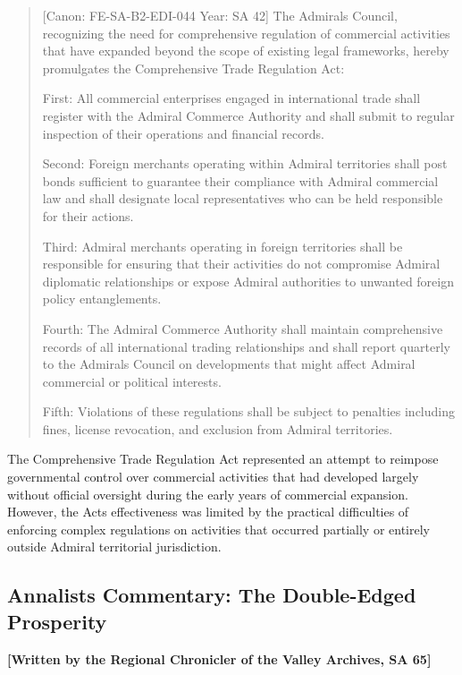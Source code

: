 \begin{quote}
{[}Canon: FE-SA-B2-EDI-044 \textbar{} Year: SA 42{]} The
Admiral\textquotesingle s Council, recognizing the need for
comprehensive regulation of commercial activities that have expanded
beyond the scope of existing legal frameworks, hereby promulgates the
Comprehensive Trade Regulation Act:

First: All commercial enterprises engaged in international trade shall
register with the Admiral Commerce Authority and shall submit to regular
inspection of their operations and financial records.

Second: Foreign merchants operating within Admiral territories shall
post bonds sufficient to guarantee their compliance with Admiral
commercial law and shall designate local representatives who can be held
responsible for their actions.

Third: Admiral merchants operating in foreign territories shall be
responsible for ensuring that their activities do not compromise Admiral
diplomatic relationships or expose Admiral authorities to unwanted
foreign policy entanglements.

Fourth: The Admiral Commerce Authority shall maintain comprehensive
records of all international trading relationships and shall report
quarterly to the Admiral\textquotesingle s Council on developments that
might affect Admiral commercial or political interests.

Fifth: Violations of these regulations shall be subject to penalties
including fines, license revocation, and exclusion from Admiral
territories.
\end{quote}

The Comprehensive Trade Regulation Act represented an attempt to
reimpose governmental control over commercial activities that had
developed largely without official oversight during the early years of
commercial expansion. However, the Act\textquotesingle s effectiveness
was limited by the practical difficulties of enforcing complex
regulations on activities that occurred partially or entirely outside
Admiral territorial jurisdiction.

\subsection{Annalist\textquotesingle s Commentary: The Double-Edged
Prosperity}\label{annalists-commentary-the-double-edged-prosperity}

\textbf{{[}Written by the Regional Chronicler of the Valley Archives, SA
65{]}}

